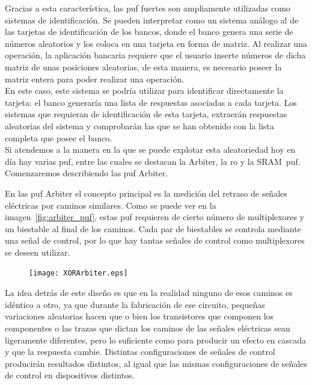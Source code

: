 \documentclass[spanish]{template/minim}
\begin{document}
Gracias a esta característica, las \gls{puf} fuertes son ampliamente utilizadas como sistemas de identificación. Se pueden interpretar como un sistema análogo al de las tarjetas de identificación de los bancos, donde el banco genera una serie de números aleatorios y los coloca en una tarjeta en forma de matriz. Al realizar una operación, la aplicación bancaria requiere que el usuario inserte números de dicha matriz de unas posiciones aleatorias, de esta manera, es necesario poseer la matriz entera para poder realizar una operación.\\

En este caso, este sistema se podría utilizar para identificar directamente la tarjeta: el banco generaría una lista de respuestas asociadas a cada tarjeta. Los sistemas que requieran de identificación de esta tarjeta, extraerán respuestas aleatorias del sistema y comprobarán las que se han obtenido con la lista completa que posee el banco.\\

Si atendemos a la manera en la que se puede explotar esta aleatoriedad hoy en día hay varias \gls{puf}, entre las cuales se destacan la Arbiter, la \gls{ro} y la SRAM~\gls{puf}. Comenzaremos describiendo las \gls{puf} Arbiter.\\



En las \gls{puf} Arbiter el concepto principal es la medición del retraso de señales eléctricas por caminos similares. Como se puede ver en la imagen~\ref{fig:arbiter_puf}, estas \gls{puf} requieren de cierto número de multiplexores y un biestable al final de los caminos. Cada par de biestables se controla mediante una señal de control, por lo que hay tantas señales de control como multiplexores se deseen utilizar.\\

\begin{figure}[H]
    \centering
    \texttt{[image: XORArbiter.eps]}
\end{figure}

La idea detrás de este diseño es que en la realidad ninguno de esos caminos es idéntico a otro, ya que durante la fabricación de ese circuito, pequeñas variaciones aleatorias hacen que o bien los transistores que componen los componentes o las trazas que dictan los caminos de las señales eléctricas sean ligeramente diferentes, pero lo suficiente como para producir un efecto en cascada y que la respuesta cambie. Distintas configuraciones de señales de control producirán resultados distintos, al igual que las mismas configuraciones de señales de control en dispositivos distintos.\\
\end{document}
